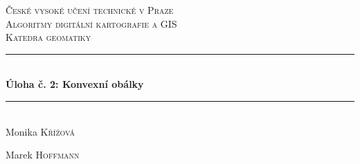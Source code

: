 \documentclass[11pt]{article}
\begin{document}
	
	
	\begin{titlepage} %
		\newcommand{\HRule}{\rule{\linewidth}{0.5mm}} %
		
		\center %
		
		
		\textsc{\LARGE České vysoké učení technické v Praze}\\[1.5cm] %
		
		\textsc{\Large Algoritmy digitální kartografie a GIS}\\[0.5cm] %
		
		\textsc{\large Katedra geomatiky}\\[0.5cm] %
		
		
		\HRule\\[0.4cm]
		
		{\huge\bfseries Úloha č. 2: Konvexní obálky}\\[0.4cm] %
		
		\HRule\\[1.5cm]
		
		
		
		
		
		Monika \textsc{Křížová} %
		
		Marek \textsc{Hoffmann}
		
		
		\vfill\vfill\vfill %
		

\end{titlepage}
\end{document}
